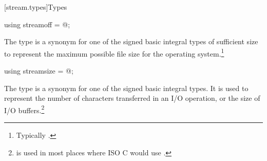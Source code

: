 [stream.types]{Types}

\begin{indexed}{}
\begin{itemdecl}
using streamoff = @\impdef@;
\end{itemdecl}
\end{indexed}

\begin{itemdescr}
\pnum
The type  is a synonym for one of the signed basic integral types of
sufficient size to represent the maximum possible file size for the operating system.\footnote{Typically .}
\end{itemdescr}

\begin{indexed}{}
\begin{itemdecl}
using streamsize = @\impdef@;
\end{itemdecl}
\end{indexed}

\begin{itemdescr}
\pnum
The type
is a synonym for one of the signed basic
integral types.
It is used to represent the number of characters transferred in an I/O
operation, or the size of I/O buffers.\footnote{
is used in most places where ISO C would use .}
\end{itemdescr}


